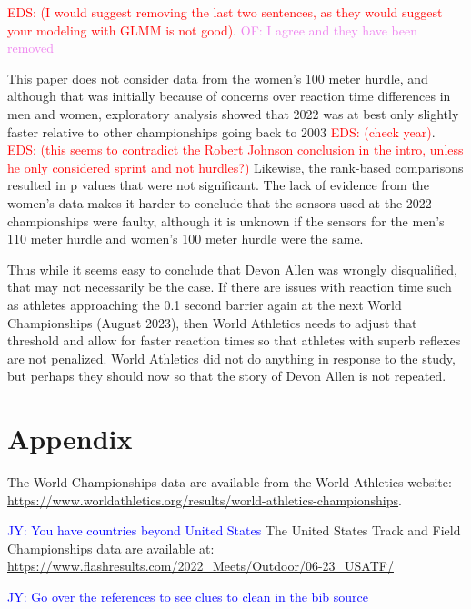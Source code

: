 \documentclass[12pt, letterpaper, titlepage]{article}
\newcommand{\jy}[1]{\textcolor{blue}{JY: #1}}
\newcommand{\eds}[1]{\textcolor{red}{EDS: (#1)}}
\newcommand{\of}[1]{\textcolor{violet}{OF: #1}}
\begin{document}
\eds{I would suggest removing the last two sentences, as they would suggest your
 modeling with GLMM is not good}.  
\of{I agree and they have been removed}

This paper does not consider data from the women's 100 meter hurdle, and although
that was initially because of concerns over reaction time differences in men and
women, exploratory analysis showed that 2022 was at best only
slightly faster relative to other championships going back to 2003 
\eds{check year}. \eds{this seems to contradict the Robert Johnson conclusion in 
the intro, unless he only considered sprint and not hurdles?} Likewise,
the rank-based comparisons resulted in p values that were not significant.  The
lack of evidence from the women's data makes it harder to conclude 
that the sensors used at the 2022 championships were faulty, although it is
unknown if the sensors for the men's 110 meter hurdle and women's 100 meter
hurdle were the same.

Thus while it seems easy
to conclude that Devon Allen was wrongly disqualified, that may not necessarily
be the case. 
If there are issues with reaction time such as athletes approaching 
the 0.1 
second barrier again at the next World Championships (August 2023), then 
World Athletics 
needs to adjust that threshold and allow for faster reaction times so that 
athletes with superb 
reflexes are not penalized. %
World Athletics did not
do anything in response to the \citet{komi2009iaaf} study, but perhaps they 
should now so
that the story of Devon Allen is not repeated.

\section*{Appendix}
\label{sec:Appendix}
The World Championships data are available from the World Athletics website:
\url{https://www.worldathletics.org/results/world-athletics-championships}.

\jy{You have countries beyond United States}
The United States Track and Field Championships data are available at: 
\url{https://www.flashresults.com/2022_Meets/Outdoor/06-23_USATF/}



\jy{Go over the references to see clues to clean in the bib source}


\end{document}
